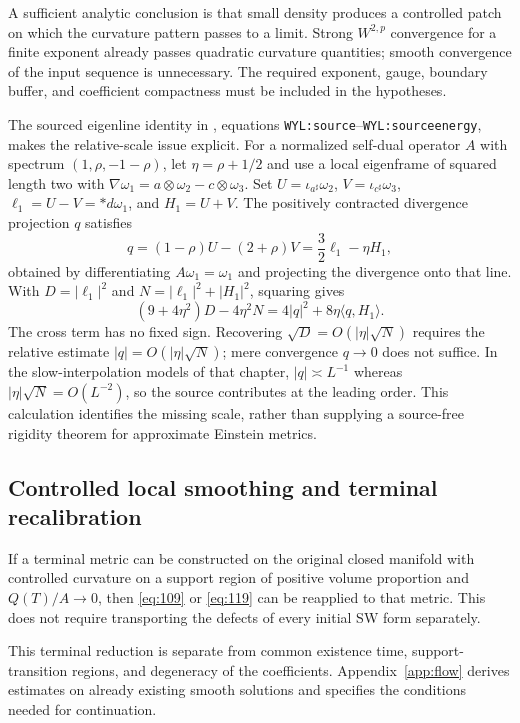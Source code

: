 \documentclass[a4paper,11pt]{article}
\numberwithin{equation}{section}
\theoremstyle{definition}
\begin{document}
A sufficient analytic conclusion is that small density produces a controlled patch on which the curvature pattern passes to a limit. Strong $W^{2,p}$ convergence for a finite exponent already passes quadratic curvature quantities; smooth convergence of the input sequence is unnecessary. The required exponent, gauge, boundary buffer, and coefficient compactness must be included in the hypotheses.

The sourced eigenline identity in , equations \texttt{WYL:source}--\texttt{WYL:sourceenergy}, makes the relative-scale issue explicit. For a normalized self-dual operator $A$ with spectrum $(1,\rho,-1-\rho)$, let $\eta=\rho+1/2$ and use a local eigenframe of squared length two with
$\nabla\omega_1=a\otimes\omega_2-c\otimes\omega_3$.
Set $U=\iota_{a^\sharp}\omega_2$, $V=\iota_{c^\sharp}\omega_3$, $\ell_1=U-V=*d\omega_1$, and $H_1=U+V$. The positively contracted divergence projection $q$ satisfies
\begin{equation}\label{eq:sourced-eigenline}
q=(1-\rho)U-(2+\rho)V=\frac32\ell_1-\eta H_1,
\end{equation}
obtained by differentiating $A\omega_1=\omega_1$ and projecting the divergence onto that line. With $D=|\ell_1|^2$ and $N=|\ell_1|^2+|H_1|^2$, squaring gives
\begin{equation}\label{eq:sourced-eigenline-energy}
(9+4\eta^2)D-4\eta^2N
=4|q|^2+8\eta\langle q,H_1\rangle.
\end{equation}
The cross term has no fixed sign. Recovering $\sqrt D=O(|\eta|\sqrt N)$ requires the relative estimate $|q|=O(|\eta|\sqrt N)$; mere convergence $q\to0$ does not suffice. In the slow-interpolation models of that chapter, $|q|\asymp L^{-1}$ whereas $|\eta|\sqrt N=O(L^{-2})$, so the source contributes at the leading order. This calculation identifies the missing scale, rather than supplying a source-free rigidity theorem for approximate Einstein metrics.

\subsection{Controlled local smoothing and terminal recalibration}
If a terminal metric can be constructed on the original closed manifold with controlled curvature on a support region of positive volume proportion and $Q(T)/A\to0$, then \eqref{eq:109} or \eqref{eq:119} can be reapplied to that metric. This does not require transporting the defects of every initial SW form separately.

This terminal reduction is separate from common existence time, support-transition regions, and degeneracy of the coefficients. Appendix~\ref{app:flow} derives estimates on already existing smooth solutions and specifies the conditions needed for continuation.
\end{document}
